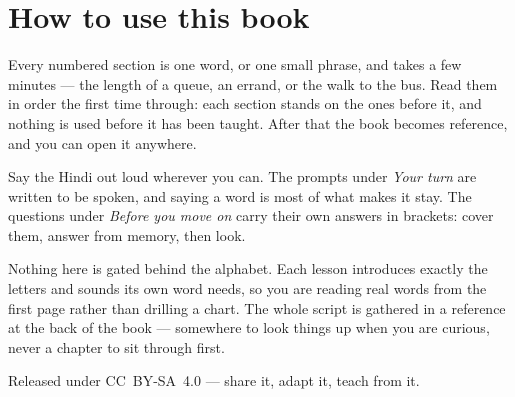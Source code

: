 \documentclass[11pt,twoside]{book}
\begin{document}
\section*{How to use this book}

Every numbered section is one word, or one small phrase, and takes a few
minutes --- the length of a queue, an errand, or the walk to the bus. Read them
in order the first time through: each section stands on the ones before it, and
nothing is used before it has been taught. After that the book becomes
reference, and you can open it anywhere.

Say the Hindi out loud wherever you can. The prompts under \emph{Your turn}
are written to be spoken, and saying a word is most of what makes it stay. The
questions under \emph{Before you move on} carry their own answers in brackets:
cover them, answer from memory, then look.

Nothing here is gated behind the alphabet. Each lesson introduces exactly the
letters and sounds its own word needs, so you are reading real words from the
first page rather than drilling a chart. The whole script is gathered in a
reference at the back of the book --- somewhere to look things up when you are
curious, never a chapter to sit through first.

Released under CC~BY-SA~4.0 --- share it, adapt it, teach from it.

\tableofcontents

\mainmatter


\end{document}
